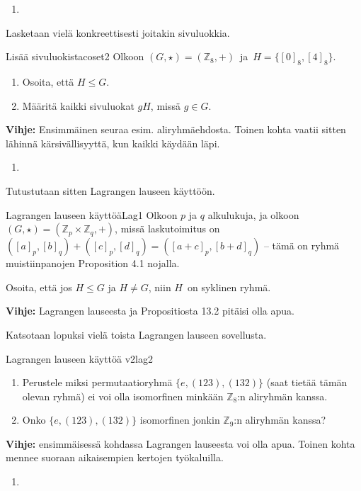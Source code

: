 \documentclass[11pt,a4paper]{amsart}
\newcommand{\Z}{\mathbb{Z}}
\newcommand{\1}{\mathbf{1}}
\begin{document}
\begin{Solution}
  \begin{enumerate}
    \item 
  \end{enumerate}
\end{Solution}

Lasketaan vielä konkreettisesti joitakin sivuluokkia.
\begin{Exercises}{Lisää sivuluokista}{coset2}
Olkoon $(G,\star)=(\Z_8,+)$ ja $H=\{[0]_8,[4]_8\}$. 
\begin{enumerate}
\item Osoita, että $H\leq G$. 
\item Määritä kaikki sivuluokat $gH$, missä $g\in G$.
\end{enumerate}
{\bf Vihje:}  Ensimmäinen seuraa esim. aliryhmäehdosta. Toinen kohta vaatii sitten lähinnä kärsivällisyyttä, kun kaikki käydään läpi.
\end{Exercises}

\begin{Solution}
  \begin{enumerate}
    \item 
  \end{enumerate}
\end{Solution}

Tutustutaan sitten Lagrangen lauseen käyttöön. 
\begin{Exercises}{Lagrangen lauseen käyttöä}{Lag1}
Olkoon $p$ ja $q$ alkulukuja, ja olkoon $(G,\star)=(\Z_p\times \Z_q,+)$, missä laskutoimitus on $([a]_p,[b]_q)+([c]_p,[d]_q)=([a+c]_p,[b+d]_q)$ -- tämä on ryhmä muistiinpanojen Proposition 4.1 nojalla.

\medskip 

Osoita, että jos $H\leq G$ ja $H\neq G$, niin $H$ on syklinen ryhmä. 

\medskip

{\bf Vihje:} Lagrangen lauseesta ja Propositiosta 13.2 pitäisi olla apua.
\end{Exercises}

\begin{Solution}
\end{Solution}

Katsotaan lopuksi vielä toista Lagrangen lauseen sovellusta. 

\begin{Exercises}{Lagrangen lauseen käyttöä v2}{lag2}
\begin{enumerate}
\item Perustele miksi permutaatioryhmä $\{e,(123),(132)\}$ (saat tietää tämän olevan ryhmä) ei voi olla isomorfinen minkään $\Z_8$:n aliryhmän kanssa.
\item Onko $\{e,(123),(132)\}$ isomorfinen jonkin $\Z_9$:n aliryhmän kanssa?
\end{enumerate}
{\bf Vihje:} ensimmäisessä kohdassa Lagrangen lauseesta voi olla apua. Toinen kohta mennee suoraan aikaisempien kertojen työkaluilla.
\end{Exercises}

\begin{Solution}
  \begin{enumerate}
    \item 
  \end{enumerate}
\end{Solution}
\end{document}
